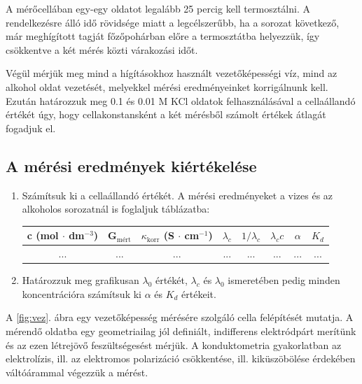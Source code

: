A mérőcellában egy-egy oldatot legalább 25 percig kell termosztálni.
A rendelkezésre álló idő rövidsége miatt a legcélszerűbb, ha a sorozat következő, már meghígított tagját főzőpohárban előre a termosztátba helyezzük, így csökkentve a két mérés közti várakozási időt.

Végül mérjük meg mind a hígításokhoz használt vezetőképességi víz, mind az alkohol oldat vezetését, melyekkel mérési eredményeinket korrigálnunk kell.
Ezután határozzuk meg 0.1 és 0.01 M KCl oldatok felhasználásával a cellaállandó értékét úgy, hogy cellakonstansként a két mérésből számolt értékek átlagát fogadjuk el.

\subsection{A mérési eredmények kiértékelése}

\begin{enumerate}
\item Számítsuk ki a cellaállandó értékét.
A mérési eredményeket a vizes és az alkoholos sorozatnál is foglaljuk táblázatba:

\begin{table}[!h]
\centering
\begin{tabular}{|c|c|c|c|c|c|c|c|}
\hline
c (mol $\cdot$ dm$^{-3}$) & G$_{\text{mért}}$ & $\kappa_{\text{korr}}$ (S $\cdot$ cm$^{-1}$) & $\lambda_c$ & $1/\lambda_c$ & $\lambda_c c$ & $\alpha$ & $K_d$ \\
\hline
... & ... & ... & ... & ... & ... & ... & ... \\
\end{tabular}
\label{table:vez}
\end{table}

\item Határozzuk meg grafikusan $\lambda_0$ értékét, $\lambda_c$ és $\lambda_0$ ismeretében pedig minden koncentrációra számítsuk ki $\alpha$ és $K_d$ értékeit.

\end{enumerate}

A \ref{fig:vez}. ábra egy vezetőképesség mérésére szolgáló cella felépítését mutatja.
A mérendő oldatba egy geometriailag jól definiált, indifferens elektródpárt merítünk és az ezen létrejövő feszültségesést mérjük.
A konduktometria gyakorlatban az elektrolízis, ill. az elektromos polarizáció csökkentése, ill. kiküszöbölése érdekében váltóárammal végezzük a mérést.

